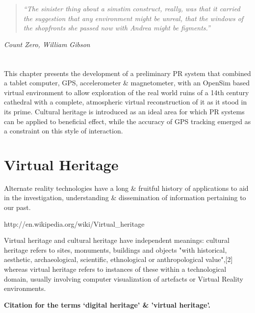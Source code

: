 \begin{quote}
	\textit{``The sinister thing about a simstim construct, really, was that it carried the suggestion that any environment might be unreal, that the windows of the shopfronts she passed now with Andrea might be figments.''}
\end{quote}
\hfill \textit{Count Zero, William Gibson}
\\
\\
\\


This chapter presents the development of a preliminary PR system that combined a tablet computer, GPS, accelerometer \& magnetometer, with an OpenSim based virtual environment to allow exploration of the real world ruins of a 14th century cathedral with a complete, atmospheric virtual reconstruction of it as it stood in its prime. Cultural heritage is introduced as an ideal area for which PR systems can be applied to beneficial effect, while the accuracy of GPS tracking emerged as a constraint on this style of interaction.


\section{Virtual Heritage}

Alternate reality technologies have a long \& fruitful history of applications to aid in the investigation, understanding \& dissemination of information pertaining to our past.

http://en.wikipedia.org/wiki/Virtual_heritage

Virtual heritage and cultural heritage have independent meanings: cultural heritage refers to sites, monuments, buildings and objects "with historical, aesthetic, archaeological, scientific, ethnological or anthropological value",[2] whereas virtual heritage refers to instances of these within a technological domain, usually involving computer visualization of artefacts or Virtual Reality environments.

\textbf{Citation for the terms `digital heritage' \& 'virtual heritage'.}


